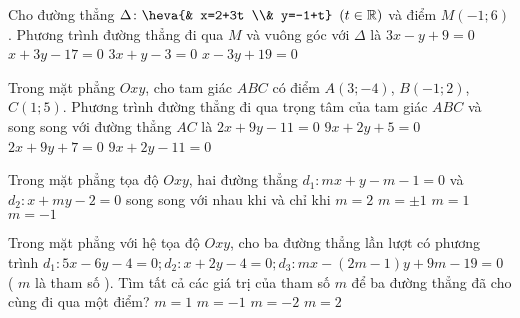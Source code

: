 	\begin{ex}%
		Cho đường thẳng $\Delta \colon \heva{& x=2+3t \\& y=-1+t}~\left(t \in \mathbb{R}\right)$ và điểm $M(-1;6)$. Phương trình đường thẳng đi qua $M$ và vuông góc với $\Delta$ là
		\choice
		{$3x-y+9=0$}
		{$x+3y-17=0$}
		{\True $3x+y-3=0$}
		{$x-3y+19=0$}
	\end{ex}
	\begin{ex}%
		Trong mặt phẳng $Oxy$, cho tam giác $ABC$ có điểm $A(3;-4)$, $B(-1;2)$, $C(1;5)$. Phương trình đường thẳng đi qua trọng tâm của tam giác $ABC$ và song song với đường thẳng $AC$ là
		\choice
		{$2x+9y-11=0$}
		{$9x+2y+5=0$}
		{$2x+9y+7=0$}
		{\True $9x+2y-11=0$}
	\end{ex}
	\begin{ex}%
		Trong mặt phẳng tọa độ $Oxy$, hai đường thẳng $d_1 \colon mx+y-m-1=0$ và $d_2 \colon x+my-2=0$ song song với nhau khi và chỉ khi
		\choice
		{$m=2$}
		{\True $m=\pm 1$}
		{$m=1$}
		{$m=-1$}
	\end{ex}
	\begin{ex}%
		Trong mặt phẳng với hệ tọa độ $Oxy$, cho ba đường thẳng lần lượt có phương trình $d_1 \colon 5x-6y-4=0;d_2 \colon x+2y-4=0;d_3 \colon mx-(2m-1)y+9m-19=0$ ( $m$ là tham số ). Tìm tất cả các giá trị của tham số $m$ để ba đường thẳng đã cho cùng đi qua một điểm?
		\choice
		{$m=1$}
		{$m=-1$}
		{$m=-2$}
		{\True $m=2$}
	\end{ex}
